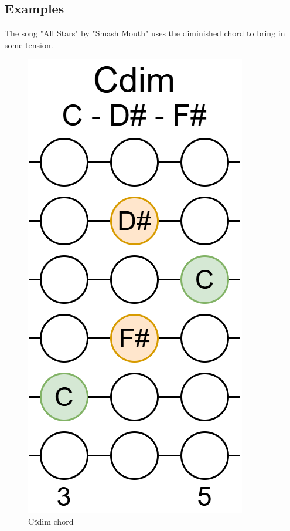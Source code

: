 \newpage

\subsection{Examples}


The song "All Stars" by "Smash Mouth" uses the diminished chord to bring in some tension.
 
\begin{figure}[h]
	\centering
	\includegraphics[height=0.16\textheight]{../../Images/CDimChord.png}
	\caption{C$\sharp$dim chord}
	\label{fig:guitar_c_sharp_dim_chord}
\end{figure}

